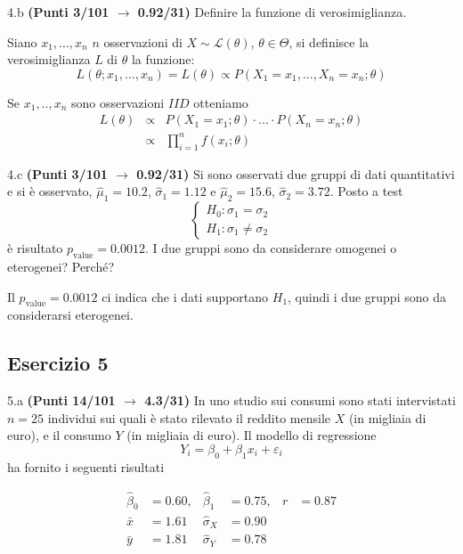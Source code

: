 \documentclass[
  11pt,
]{book}
\theoremstyle{mytheoremstyle}
\theoremstyle{mydefstyle}
\newenvironment{sol}
  {
  \begin{tcolorbox}[enhanced,breakable,arc=0.1mm,boxrule=1pt,colback=white,colframe=iblue,
  title=\bf \fontfamily{lmss}\selectfont \hspace{.5 cm} Soluzione,drop fuzzy shadow]

}{
\end{tcolorbox}
  }
\begin{document}
4.b \textbf{(Punti 3/101 \(\rightarrow\) 0.92/31)} Definire la funzione di verosimiglianza.

\begin{sol}
Siano \(x_1,...,x_n\) \(n\) osservazioni di \(X\sim \mathscr{L}(\theta)\), \(\theta\in\Theta\), si definisce la verosimiglianza \(L\) di \(\theta\) la funzione:
\[L(\theta;x_1,...,x_n)=L(\theta)\propto P(X_1=x_1,...,X_n=x_n;\theta)\]

Se \(x_1,..,x_n\) sono osservazioni \(IID\) otteniamo
\begin{eqnarray*}
L(\theta) &\propto& P(X_1=x_1;\theta)\cdot...\cdot P(X_n=x_n;\theta) \\
          &\propto& \prod_{i=1}^n f(x_i;\theta)
\end{eqnarray*}

\end{sol}

4.c \textbf{(Punti 3/101 \(\rightarrow\) 0.92/31)} Si sono osservati due gruppi di dati quantitativi e si è osservato, \(\hat\mu_1=10.2\), \(\hat\sigma_1=1.12\) e \(\hat\mu_2=15.6\), \(\hat\sigma_2=3.72\). Posto a test
\[
\begin{cases}
H_0:\sigma_1=\sigma_2\\
H_1:\sigma_1\ne \sigma_2
\end{cases}
\]
è risultato \(p_\text{value}=0.0012\). I due gruppi sono da considerare omogenei o eterogenei? Perché?

\begin{sol}
Il \(p_\text{value}=0.0012\) ci indica che i dati supportano \(H_1\), quindi i due gruppi
sono da considerarsi eterogenei.

\end{sol}

\subsection{Esercizio 5}\label{esercizio-5-3}

5.a \textbf{(Punti 14/101 \(\rightarrow\) 4.3/31)} In uno studio sui consumi sono stati intervistati \(n=25\) individui
sui quali è stato rilevato il reddito mensile \(X\) (in migliaia di euro), e il consumo \(Y\) (in migliaia di euro). Il modello di regressione
\[
Y_i=\beta_0+\beta_1 x_i+\varepsilon_i
\]
ha fornito i seguenti risultati

\begin{align*}
\hat\beta_0&=0.60, &\hat\beta_1&=0.75, &r&=0.87\\
\bar x&=1.61 &\hat \sigma_X&=0.90\\
\bar y&=1.81 &\hat \sigma_Y&=0.78\\
\end{align*}
\end{document}

